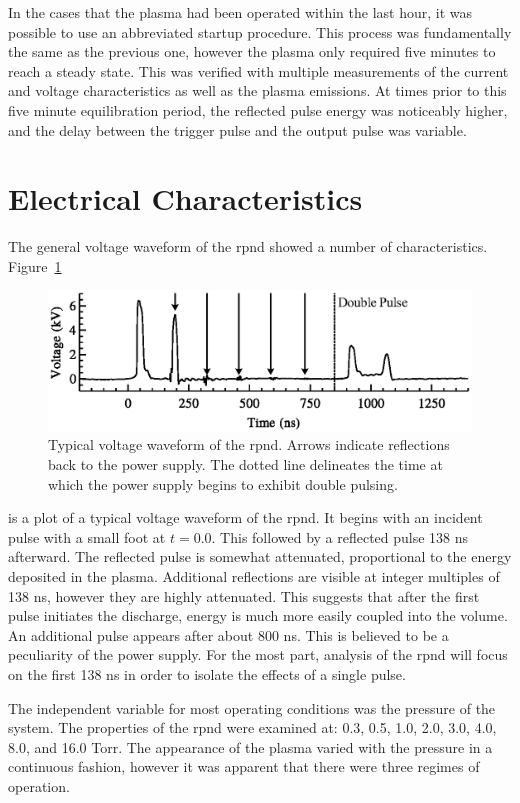 In the cases that the plasma had been operated within the last hour, it was
possible to use an abbreviated startup procedure. This process was fundamentally
the same as the previous one, however the plasma only required five minutes to
reach a steady state. This was verified with multiple measurements of the
current and voltage characteristics as well as the plasma emissions. At times
prior to this five minute equilibration period, the reflected pulse energy was
noticeably higher, and the delay between the trigger pulse and the output pulse
was variable.

\section{Electrical Characteristics}

The general voltage waveform of the \acs{rpnd} showed a number of
characteristics. Figure~\ref{fig:waveform}
\begin{figure}
  \centering
  \includegraphics{./chapters/experiment/figures/waveform.eps}
  \caption{Typical voltage waveform of the \acs{rpnd}. Arrows indicate
    reflections back to the power supply. The dotted line delineates the time at
    which the power supply begins to exhibit double pulsing.}
  \label{fig:waveform}
\end{figure}
is a plot of a typical voltage waveform of the \acs{rpnd}. It begins with an
incident pulse with a small foot at $t = 0.0$. This followed by a reflected
pulse 138 ns afterward. The reflected pulse is somewhat attenuated, proportional
to the energy deposited in the plasma. Additional reflections are visible at
integer multiples of 138 ns, however they are highly attenuated. This suggests
that after the first pulse initiates the discharge, energy is much more easily
coupled into the volume. An additional pulse appears after about 800 ns. This is
believed to be a peculiarity of the power supply. For the most part, analysis of
the \acs{rpnd} will focus on the first 138 ns in order to isolate the effects of
a single pulse.

The independent variable for most operating conditions was the pressure of the
system. The properties of the \acs{rpnd} were examined at: 0.3, 0.5, 1.0, 2.0,
3.0, 4.0, 8.0, and 16.0 Torr. The appearance of the plasma varied with the
pressure in a continuous fashion, however it was apparent that there were three
regimes of operation.

